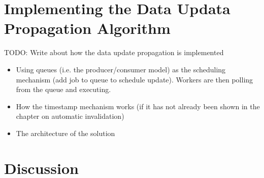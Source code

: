 



\section{Implementing the Data Updata Propagation Algorithm}
\label{sec:implementing-the-data-updata-propagation-algorithm}

TODO: Write about how the data update propagation is implemented

\begin{itemize}
  \item Using queues (i.e. the producer/consumer model) as the scheduling mechanism (add job to queue to schedule update). Workers are then polling from the queue and executing.
  \item How the timestamp mechanism works (if it has not already been shown in the chapter on automatic invalidation)
  \item The architecture of the solution
\end{itemize}


\section{Discussion}
\label{sec:discussion}



